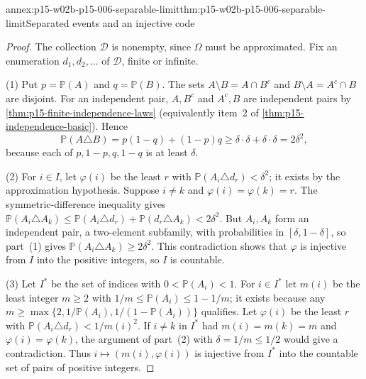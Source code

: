 \begin{annexitem}{annex:p15-w02b-p15-006-separable-limit}{thm:p15-w02b-p15-006-separable-limit}{Separated events and an injective code}
\begin{proof}
The collection \(\mathcal D\) is nonempty, since \(\Omega\) must be
approximated. Fix an enumeration \(d_1,d_2,\ldots\) of \(\mathcal D\),
finite or infinite.

(1) Put \(p=\mathbb P(A)\) and \(q=\mathbb P(B)\). The sets
\(A\setminus B=A\cap B^c\) and \(B\setminus A=A^c\cap B\) are disjoint.
For an independent pair, \(A,B^c\) and \(A^c,B\) are independent pairs by
\cref{thm:p15-finite-independence-laws} (equivalently item~2 of
\cref{thm:p15-independence-basic}). Hence
\[
 \mathbb P(A\triangle B)=p(1-q)+(1-p)q\geq\delta\cdot\delta+\delta\cdot\delta
                       =2\delta^2,
\]
because each of \(p,1-p,q,1-q\) is at least \(\delta\).

(2) For \(i\in I\), let \(\varphi(i)\) be the least \(r\) with
\(\mathbb P(A_i\triangle d_r)<\delta^2\); it exists by the approximation
hypothesis. Suppose \(i\neq k\) and \(\varphi(i)=\varphi(k)=r\). The
symmetric-difference inequality gives
\(\mathbb P(A_i\triangle A_k)\leq\mathbb P(A_i\triangle d_r)
+\mathbb P(d_r\triangle A_k)<2\delta^2\). But \(A_i,A_k\) form an
independent pair, a two-element subfamily, with probabilities in
\([\delta,1-\delta]\), so part~(1) gives
\(\mathbb P(A_i\triangle A_k)\geq2\delta^2\). This contradiction shows
that \(\varphi\) is injective from \(I\) into the positive integers,
so \(I\) is countable.

(3) Let \(I^*\) be the set of indices with \(0<\mathbb P(A_i)<1\). For
\(i\in I^*\) let \(m(i)\) be the least integer \(m\geq2\) with
\(1/m\leq\mathbb P(A_i)\leq1-1/m\); it exists because any
\(m\geq\max\{2,1/\mathbb P(A_i),1/(1-\mathbb P(A_i))\}\) qualifies. Let
\(\varphi(i)\) be the least \(r\) with
\(\mathbb P(A_i\triangle d_r)<1/m(i)^2\). If \(i\neq k\) in \(I^*\)
had \(m(i)=m(k)=m\) and \(\varphi(i)=\varphi(k)\), the argument of
part~(2) with \(\delta=1/m\leq1/2\) would give a contradiction. Thus
\(i\mapsto(m(i),\varphi(i))\) is injective from \(I^*\) into the
countable set of pairs of positive integers.


\end{proof}
\end{annexitem}
